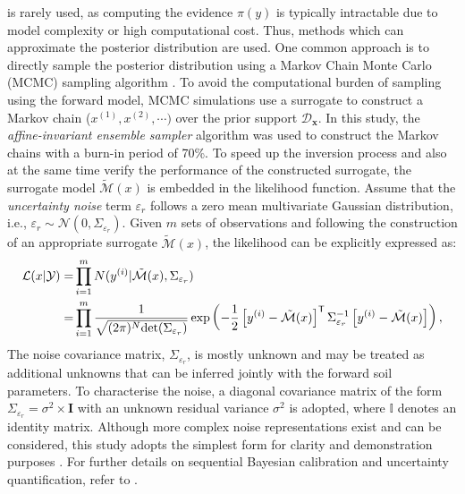 is rarely used, as computing the evidence $\pi(y)$ is typically intractable due to model complexity or high computational cost. Thus, methods which can approximate the posterior distribution are used. One common approach is to directly sample the posterior distribution using a Markov Chain Monte Carlo (MCMC) sampling algorithm \parencite{andrieu2003}. To avoid the computational burden of sampling using the forward model, MCMC simulations use a surrogate to construct a Markov chain ($x^{(1)}, x^{(2)}, \cdots )$ over the prior support $\mathcal{D}_{\boldsymbol{x}}$. In this study, the \textit{affine-invariant ensemble sampler} algorithm was used to construct the Markov chains with a burn-in period of 70\%. To speed up the inversion process and also at the same time verify the performance of the constructed surrogate, the surrogate model $\tilde{\mathcal{M}}(x)$ is embedded in the likelihood function. Assume that the \textit{uncertainty noise} term $\varepsilon_{r}$ follows a zero mean multivariate Gaussian distribution, i.e., $\varepsilon_{r} \sim \mathcal{N}(0,\Sigma_{\varepsilon_{r}})$. Given $m$ sets of observations and following the construction of an appropriate surrogate $\tilde{\mathcal{M}}(x)$, the likelihood can be explicitly expressed as:
\begin{equation} 
 \label{eq: modified_Likelihood function}
\begin{aligned}
 \mathcal{L}(x|\mathcal{Y}) =& \prod_{i=1}^{m} N(y^{(i)}|\tilde{\mathcal{M}}(x),\Sigma_{\varepsilon_{r}}) \\
 =& \prod_{i=1}^{m}\frac{1}{\sqrt{(2 \pi)^{N}{\rm{det}} 
 (\Sigma_{\varepsilon_{r}})}}\exp\left(-\frac{1}{2}\left[y^{(i)} - \tilde{\mathcal{M}}(x)\right]^{\mathsf{T}} \Sigma_{\varepsilon_{r}}^{-1}\left[y^{(i)} - \tilde{\mathcal{M}}(x)\right]\right) ,
\end{aligned}
\end{equation} 
\noindent The noise covariance matrix, $\Sigma_{\varepsilon_{r}}$, is mostly unknown and may be treated as additional unknowns that can be inferred jointly with the forward soil parameters. To characterise the noise, a diagonal covariance matrix of the form $\Sigma_{\varepsilon_{r}} = \sigma^2 \times \mathbf{I}$ with an unknown residual variance $\sigma^2$ is adopted, where $\mathbb{I}$ denotes an identity matrix. Although more complex noise representations exist and can be considered, this study adopts the simplest form for clarity and demonstration purposes \cite{hsein2013,lo2019}. For further details on sequential Bayesian calibration and uncertainty quantification, refer to \cite{yang2026}. 


